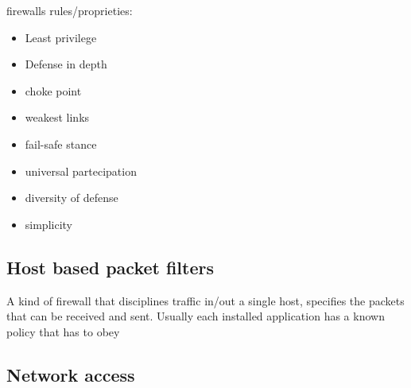 firewalls rules/proprieties:
\begin{itemize}
    \item Least privilege
    \item Defense in depth
    \item choke point
    \item weakest links
    \item fail-safe stance
    \item universal partecipation
    \item diversity of defense
    \item simplicity
\end{itemize}

\subsection{Host based packet filters}
A kind of firewall that disciplines traffic in/out a single host, specifies the packets that can be received and sent. Usually each installed application has a known policy that has to obey

\subsection{Network access }